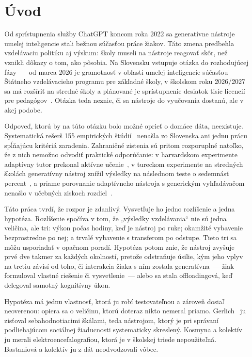 \chapter{Úvod}
\label{chapter:Introduction}

Od sprístupnenia služby ChatGPT koncom roka 2022 sa generatívne nástroje umelej inteligencie stali bežnou súčasťou práce žiakov. Táto zmena predbehla vzdelávaciu politiku aj výskum: školy museli na nástroje reagovať skôr, než vznikli dôkazy o tom, ako pôsobia. Na Slovensku vstupuje otázka do rozhodujúcej fázy~--- od marca 2026 je gramotnosť v oblasti umelej inteligencie súčasťou Štátneho vzdelávacieho programu pre základné školy, v školskom roku 2026/2027 sa má rozšíriť na stredné školy a plánované je sprístupnenie desiatok tisíc licencií pre pedagógov~\cite{minedu2025plan,drucker2026competence}. Otázka teda neznie, či sa nástroje do vyučovania dostanú, ale v akej podobe.

Odpoveď, ktorú by na túto otázku bolo možné oprieť o domáce dáta, neexistuje. Systematická rešerš 155 empirických štúdií~\cite{garzon2025systematic} nenašla zo Slovenska ani jednu prácu spĺňajúcu kritériá zaradenia. Zahraničné zistenia sú pritom rozporuplné natoľko, že z nich nemožno odvodiť praktické odporúčanie: v harvardskom experimente adaptívny tutor prekonal aktívne učenie~\cite{kestin2025aitutoring}, v tureckom experimente na stredných školách generatívny nástroj znížil výsledky na následnom teste o sedemnásť percent~\cite{bastani2025harm}, a priame porovnanie adaptívneho nástroja s generickým vyhľadávačom nenašlo v učebných ziskoch rozdiel~\cite{slijepcevic2025khanmigo}.

Táto práca tvrdí, že rozpor je zdanlivý. Vysvetľuje ho jedno rozlíšenie a jedna hypotéza. Rozlíšenie spočíva v tom, že „výsledky vzdelávania“ nie sú jedna veličina, ale tri: výkon počas hodiny, keď je nástroj po ruke; okamžité vybavenie bezprostredne po nej; a trvalé vybavenie s transferom po odstupe. Tieto tri sa môžu usporiadať v opačnom poradí. Hypotéza potom znie, že nástroj zvyšuje prvé dve takmer za každých okolností, pretože odstraňuje úsilie, kým jeho vplyv na tretiu závisí od toho, či interakcia žiaka s ním zostala generatívna~--- žiak formuloval vlastné riešenie či vysvetlenie~--- alebo sa stala offloadingová, keď delegoval samotný kognitívny úkon.

Hypotéza má jednu vlastnosť, ktorá ju robí testovateľnou a zároveň dosiaľ neoverenou: opiera sa o veličinu, ktorú doteraz nikto nemeral priamo. Gerlich~\cite{gerlich2025offloading} ju zisťoval sebahodnotiacimi škálami, teda nástrojom, ktorý je pri správaní podliehajúcom sociálnej žiaducnosti systematicky skreslený. Kosmyna a kolektív~\cite{kosmyna2025brain} ju merali elektroencefalografiou, ktorá je v školskej triede nepoužiteľná. Bastaniová a kolektív ju z dát neodvodzovali vôbec.

